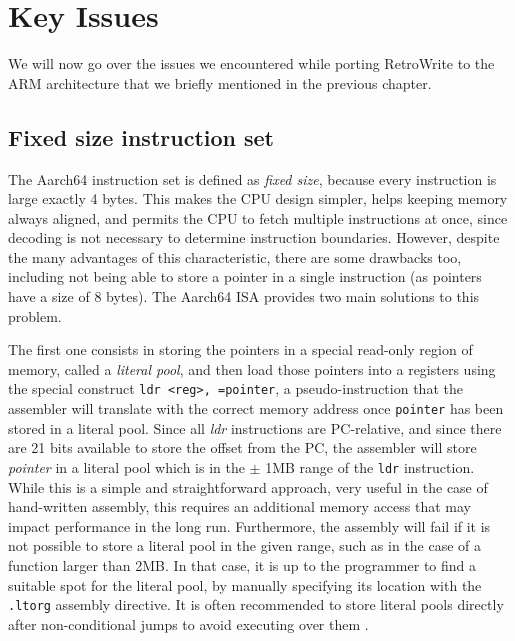 \documentclass[a4paper,11pt,oneside]{report}
\newcommand{\sysname}{RetroWrite\xspace}
\begin{document}
\section{Key Issues}
We will now go over the issues we encountered while porting \sysname to the 
ARM architecture that we briefly mentioned in the previous chapter.  

\subsection{Fixed size instruction set}
The Aarch64 instruction set is defined as \emph{fixed size}, because every 
instruction is large exactly 4 bytes. This makes the CPU design simpler,
helps keeping memory always aligned, and permits the CPU to fetch multiple 
instructions at once, since decoding is not necessary to determine instruction 
boundaries. However, despite the many advantages of this characteristic, there 
are some drawbacks too, including not being able to store a pointer in a single 
instruction (as pointers have a size of 8 bytes). The Aarch64 ISA provides two 
main solutions to this problem. 

The first one consists in storing the pointers in a special read-only region of 
memory, called a \emph{literal pool}, and then load those pointers into a 
registers using the special construct \texttt{ldr <reg>, =pointer}, a 
pseudo-instruction that the assembler will translate with the correct memory 
address once \texttt{pointer} has been stored in a literal pool.  Since all 
\emph{ldr} instructions are PC-relative, and since there are 21 bits available 
to store the offset from the PC, the assembler will store \emph{pointer} in a 
literal pool which is in the $\pm$ 1MB range of the \texttt{ldr} instruction.  
While this is a simple and straightforward approach, very useful in the case of 
hand-written assembly, this requires an additional memory access that may 
impact performance in the long run. Furthermore, the assembly will fail if it 
is not possible to store a literal pool in the given range, such as in the case 
of a function larger than 2MB. In that case, it is up to the programmer to find 
a suitable spot for the literal pool, by manually specifying its location with 
the \texttt{.ltorg} assembly directive. It is often recommended to store 
literal pools directly after non-conditional jumps to avoid executing over them 
\cite{literalpools}.
\end{document}
